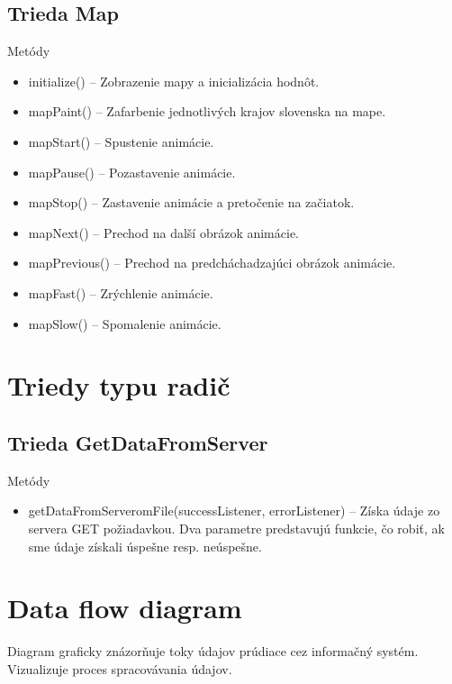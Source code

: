\documentclass[12pt,a4paper]{report}
\begin{document}
\subsection[Trieda Map]{\rmfamily\bfseries
	Trieda Map}

Metódy
\begin{itemize}
	\item initialize() – Zobrazenie mapy a inicializácia hodnôt.
	\item mapPaint() – Zafarbenie jednotlivých krajov slovenska na mape.
	\item mapStart() – Spustenie animácie.
	\item mapPause() – Pozastavenie animácie.
	\item mapStop() – Zastavenie animácie a pretočenie na začiatok.
	\item mapNext() – Prechod na další obrázok animácie.
	\item mapPrevious() – Prechod na predcháchadzajúci obrázok animácie.
	\item mapFast() – Zrýchlenie animácie.
	\item mapSlow() – Spomalenie animácie.
\end{itemize}

\section[Triedy typu radič]{\rmfamily\bfseries
	Triedy typu radič}

\subsection[Trieda GetDataFromServer]{\rmfamily\bfseries
	Trieda GetDataFromServer}
Metódy
\begin{itemize}
	\item getDataFromServeromFile(successListener, errorListener) – Získa údaje zo servera GET požiadavkou. Dva parametre predstavujú funkcie, čo robiť, ak sme údaje získali úspešne resp. neúspešne.
\end{itemize}

\section[Data flow diagram]{\rmfamily\bfseries
	Data flow diagram}
	Diagram graficky znázorňuje toky údajov prúdiace cez informačný systém. Vizualizuje proces spracovávania údajov.
	
\end{document}
